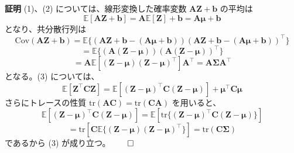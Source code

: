 \documentclass{article}
\begin{document}
\bigskip

\noindent
\textbf{証明} (1)、(2) については、線形変換した確率変数 $\bm{A}\bm{Z} + \bm{b}$ の平均は
\[
\mathbb{E}[\bm{A}\bm{Z} + \bm{b}] = \bm{A}\mathbb{E}[\bm{Z}] + \bm{b} = \bm{A}\bm{\mu} + \bm{b}
\]
となり、共分散行列は
\[
\mathrm{Cov}(\bm{A}\bm{Z} + \bm{b}) = \mathbb{E}\{ (\bm{A}\bm{Z} + \bm{b} - (\bm{A}\bm{\mu} + \bm{b})) (\bm{A}\bm{Z} + \bm{b} - (\bm{A}\bm{\mu} + \bm{b}))^\top \}
\]
\[
= \mathbb{E}\{ (\bm{A}(\bm{Z} - \bm{\mu})) (\bm{A}(\bm{Z} - \bm{\mu}))^\top \}
\]
\[
= \bm{A}\mathbb{E}[(\bm{Z} - \bm{\mu})(\bm{Z} - \bm{\mu})^\top] \bm{A}^\top = \bm{A}\bm{\Sigma}\bm{A}^\top
\]
となる。(3) については、
\[
\mathbb{E}[\bm{Z}^\top \bm{C} \bm{Z}] = \mathbb{E}[(\bm{Z} - \bm{\mu})^\top \bm{C} (\bm{Z} - \bm{\mu})] + \bm{\mu}^\top \bm{C} \bm{\mu}
\]
さらにトレースの性質 $\mathrm{tr}(\bm{AC}) = \mathrm{tr}(\bm{CA})$ を用いると、
\[
\mathbb{E}[(\bm{Z} - \bm{\mu})^\top \bm{C} (\bm{Z} - \bm{\mu})] = \mathbb{E}[\mathrm{tr} \{ (\bm{Z} - \bm{\mu})^\top \bm{C} (\bm{Z} - \bm{\mu}) \}]
\]
\[
= \mathrm{tr}[\bm{C}\mathbb{E}\{ (\bm{Z} - \bm{\mu})(\bm{Z} - \bm{\mu})^\top \}] = \mathrm{tr}(\bm{C}\bm{\Sigma})
\]
であるから (3) が成り立つ。$\qed$
\end{document}
